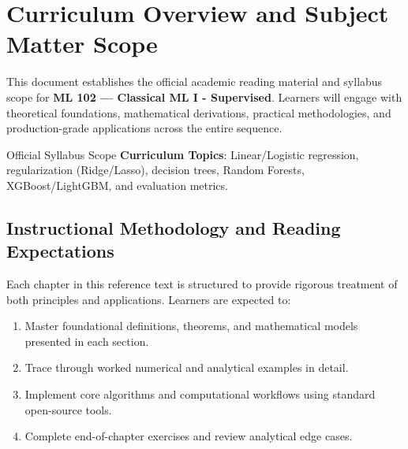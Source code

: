 \section{Curriculum Overview and Subject Matter Scope}

This document establishes the official academic reading material and syllabus scope for \textbf{ML 102 --- Classical ML I - Supervised}. Learners will engage with theoretical foundations, mathematical derivations, practical methodologies, and production-grade applications across the entire sequence.

\begin{InsightBox}{Official Syllabus Scope}
  \textbf{Curriculum Topics}: Linear/Logistic regression, regularization (Ridge/Lasso), decision trees, Random Forests, XGBoost/LightGBM, and evaluation metrics.
\end{InsightBox}

\subsection{Instructional Methodology and Reading Expectations}

Each chapter in this reference text is structured to provide rigorous treatment of both principles and applications. Learners are expected to:
\begin{enumerate}
  \item Master foundational definitions, theorems, and mathematical models presented in each section.
  \item Trace through worked numerical and analytical examples in detail.
  \item Implement core algorithms and computational workflows using standard open-source tools.
  \item Complete end-of-chapter exercises and review analytical edge cases.
\end{enumerate}

